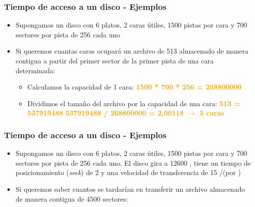 \begin{frame}
  \frametitle{Tiempo de acceso a un disco - Ejemplos}
  \begin{itemize}
    \item Supongamos un disco con 6 platos, 2 caras útiles, 1500 pistas por cara y 700 sectores por pista de 256 \bytes cada uno
    \item Si queremos cuantas caras ocupará un archivo de 513 \mebishort\bytes almacenado de manera contigua a partir del primer sector de la primer pista de una cara determinada:
    \begin{itemize}
      \item Calculamos la capacidad de 1 cara:
      \linebreak      
      \hspace{35pt} \textcolor{orange}{\textbf{1500 * 700 * 256 \bytes = 268800000 \bytes}}
      \linebreak
      \item Dividimos el tamaño del archivo por la capacidad de una cara:
      \hspace{35pt} \textcolor{orange}{\textbf{513 \mebishort\bytesshort = 537919488 \bytes}}
      \linebreak
      \hspace{35pt} \textcolor{orange}{\textbf{537919488 / 268800000 = 2,00118  $\rightarrow$ 3 caras}}
    \end{itemize}
  \end{itemize}
\end{frame}

\begin{frame}
  \frametitle{Tiempo de acceso a un disco - Ejemplos}
  \begin{itemize}
    \item Supongamos un disco con 6 platos, 2 caras útiles, 1500 pistas por cara y 700 sectores por pista de 256 \bytes cada uno. El disco gira a 12600 \rpm, tiene un tiempo de posicionamiento (\textit{seek}) de 2 \milisegundos y una velocidad de transferencia de 15 \mebishort\bitsshort/\s (\mebi\bits por \segundo)
    \item Si queremos saber cuantos \milisegundos se tardarían en transferir un archivo almacenado de manera contigua de 4500 sectores:
    
  \end{itemize}
\end{frame}



